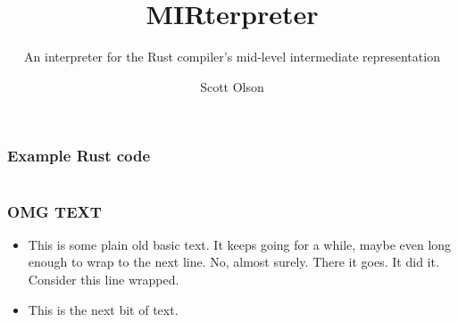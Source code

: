 \documentclass{beamer}
\title{MIRterpreter}
\subtitle{
  An interpreter for the Rust compiler's mid-level intermediate representation}
\author{Scott Olson}
\begin{document}
\maketitle

\begin{frame}[fragile]
  \frametitle{Example Rust code}
  \inputminted{rust}{code.rs}
\end{frame}

\begin{frame}[fragile]
  \frametitle{OMG TEXT}

  \begin{itemize}
    \item This is some plain old basic text. It keeps going for a while, maybe
      even long enough to wrap to the next line. No, almost surely. There it
      goes. It did it. Consider this line wrapped.

    \item This is the next bit of text.

  \end{itemize}
\end{frame}
\end{document}
